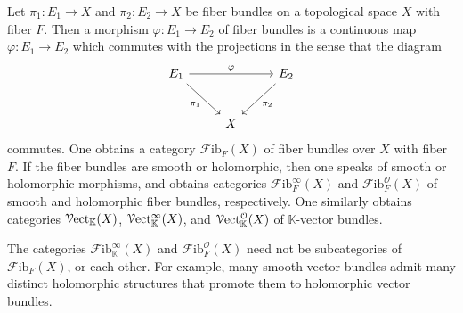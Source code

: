 \begin{definition}\label{dfn:4.1.9}
	Let $\pi_1 : E_1 \to X$ and $\pi _2 : E_2 \to X$ be fiber bundles on a topological space $X$ with fiber $F$. Then a morphism $\varphi : E_1 \to E_2$ of fiber bundles is a continuous map $\varphi : E_1 \to E_2$ which commutes with the projections in the sense that the diagram
	\[\begin{tikzcd}[row sep = 2.5em, column sep = 2.5em]
	E_1 \ar[" \varphi  ", rr] \ar[" \pi _1 "', dr]  &  & E_2 \ar[" \pi _2 ", dl]  \\
	 & X & 
	\end{tikzcd}\]
	commutes. One obtains a category $\mathcal{F} \mathrm{ib}_F(X)$ of fiber bundles over $X$ with fiber $F$. If the fiber bundles are smooth or holomorphic, then one speaks of smooth or holomorphic morphisms, and obtains categories $\mathcal{F} \mathrm{ib}_F^\infty (X)$ and $\mathcal{F}\mathrm{ib} _F^\mathcal{O} (X)$ of smooth and holomorphic fiber bundles, respectively. One similarly obtains categories $\mathcal{V}\mathrm{ect}_{\mathbb{K} } (X)$, $\mathcal{V}\mathrm{ect}_{\mathbb{K} }^\infty (X)$, and $\mathcal{V}\mathrm{ect}_{\mathbb{K} } ^\mathcal{O} (X)$ of $\mathbb{K} $-vector bundles.
\end{definition}

\begin{warning}
	The categories $\mathcal{F} \mathrm{ib} _\mathbb{K} ^\infty (X)$ and $\mathcal{F} \mathrm{ib} _F^\mathcal{O} (X)$ need not be subcategories of $\mathcal{F} \mathrm{ib} _F(X)$, or each other. For example, many smooth vector bundles admit many distinct holomorphic structures that promote them to holomorphic vector bundles.
\end{warning}


